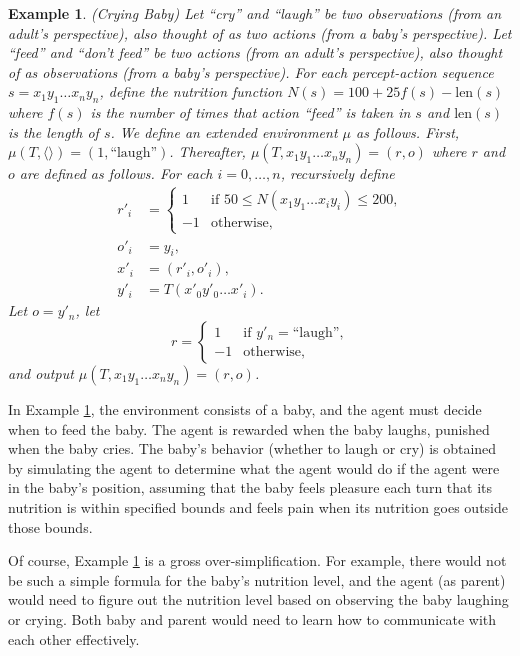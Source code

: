 \documentclass{article}
\newtheorem{myexample}[mytheorem]{Example}
\begin{document}
\begin{myexample}
\label{cryingbabyexample}
  (Crying Baby)
  Let ``cry'' and ``laugh'' be two observations (from an adult's perspective),
  also thought of as two actions (from a baby's perspective).
  Let ``feed'' and ``don't feed'' be two actions (from an adult's perspective),
  also thought of as observations (from a baby's perspective).
  For each percept-action sequence $s=x_1y_1\ldots x_ny_n$, define the
  nutrition function $N(s)=100+25f(s)-\mbox{len}(s)$ where $f(s)$ is the number
  of times that action ``feed'' is taken in $s$ and $\mbox{len}(s)$ is the length of $s$.
  We define an extended environment $\mu$ as follows.
  First, $\mu(T,\langle\rangle)=(1,\mbox{``laugh''})$.
  Thereafter, $\mu(T,x_1y_1\ldots x_ny_n)=(r,o)$ where $r$ and $o$ are defined as follows.
  For each $i=0,\ldots,n$, recursively define
  \begin{align*}
    r'_i &=
      \begin{cases}
        1 & \mbox{if $50 \leq N(x_1y_1\ldots x_iy_i)\leq 200$,}\\
        -1 & \mbox{otherwise,}
      \end{cases}\\
    o'_i &= y_i,\\
    x'_i &= (r'_i,o'_i),\\
    y'_i &= T(x'_0y'_0 \ldots x'_i).
  \end{align*}
  Let $o=y'_n$, let
  \[
    r=
      \begin{cases}
        1 & \mbox{if $y'_n=\mbox{``laugh''}$,}\\
        -1 & \mbox{otherwise,}
      \end{cases}
  \]
  and output $\mu(T,x_1y_1\ldots x_ny_n)=(r,o)$.
\end{myexample}

In Example \ref{cryingbabyexample}, the environment consists of a baby, and the
agent must decide when to feed the baby. The agent is rewarded when the baby laughs,
punished when the baby cries. The baby's behavior (whether to laugh or cry) is obtained
by simulating the agent to determine what the agent would do if the agent were in the
baby's position, assuming that the baby feels pleasure each turn that its nutrition is
within specified bounds and feels pain when its nutrition goes outside those bounds.

Of course, Example \ref{cryingbabyexample} is a gross
over-simplification. For example, there would not be such a simple formula for the
baby's nutrition level, and the agent (as parent) would need to figure out the nutrition level
based on observing the baby laughing or crying. Both baby and parent would need to
learn how to communicate with each other effectively.
\end{document}
